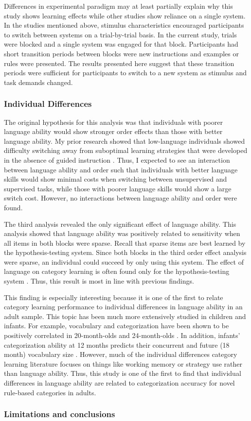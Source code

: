 \documentclass[../dissertation.tex]{subfiles}
\begin{document}
	Differences in experimental paradigm may at least partially explain why this study shows learning effects while other studies show reliance on a single system. In the studies mentioned above, stimulus characteristics encouraged participants to switch between systems on a trial-by-trial basis. In the current study, trials were blocked and a single system was engaged for that block. Participants had short transition periods between blocks were new instructions and examples or rules were presented. The results presented here suggest that these transition periods were sufficient for participants to switch to a new system as stimulus and task demands changed. 
	
\subsubsection{Individual Differences}

	The original hypothesis for this analysis was that individuals with poorer language ability would show stronger order effects than those with better language ability. My prior research showed that low-language individuals showed difficulty switching away from suboptimal learning strategies that were developed in the absence of guided instruction \citep{Ryherd2019}. Thus, I expected to see an interaction between language ability and order such that individuals with better language skills would show minimal costs when switching between unsupervised and supervised tasks, while those with poorer language skills would show a large switch cost. However, no interactions between language ability and order were found. \par
	The third analysis revealed the only significant effect of language ability. This analysis showed that language ability was positively related to sensitivity when all items in both blocks were sparse. Recall that sparse items are best learned by the hypothesis-testing system. Since both blocks in the third order effect analysis were sparse, an individual could succeed by only using this system. The effect of language on category learning is often found only for the hypothesis-testing system \citep{Lupyan2009,Lupyan2013}. Thus, this result is most in line with previous findings. \par 
	This finding is especially interesting because it is one of the first to relate category learning performance to individual differences in language ability in an adult sample. This topic has been much more extensively studied in children and infants. For example, vocabulary and  categorization have been shown to be positively correlated in 20-month-olds \citep{Nazzi2001} and 24-month-olds \citep{Jaswal2007}. In addition, infants' categorization ability at 12 months predicts their concurrent and future (18 month) vocabulary size \citep{Ferguson2015}. However, much of the individual differences category learning literature focuses on things like working memory or strategy use rather than language ability. Thus, this study is one of the first to find that individual differences in language ability are related to categorization accuracy for novel rule-based categories in adults.
	
\subsubsection{Limitations and conclusions}
	
\end{document}
